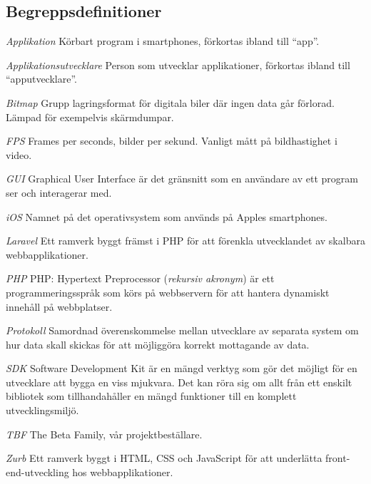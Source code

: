 \subsection{Begreppsdefinitioner}

\emph{Applikation} Körbart program i smartphones, förkortas ibland till ``app''.

\emph{Applikationsutvecklare} Person som utvecklar applikationer, förkortas  ibland till ``apputvecklare''.

\emph{Bitmap} Grupp lagringsformat för digitala biler där ingen data går förlorad. Lämpad för exempelvis skärmdumpar.

\emph{FPS} Frames per seconds, bilder per sekund. Vanligt mått på bildhastighet i video.

\emph{GUI} Graphical User Interface är det gränsnitt som en användare av ett program ser och interagerar med.

\emph{iOS} Namnet på det operativsystem som används på Apples smartphones.

\emph{Laravel} Ett ramverk byggt främst i PHP för att förenkla utvecklandet av skalbara webbapplikationer\parencite{laravel}.

\emph{PHP} PHP: Hypertext Preprocessor (\textit{rekursiv akronym}) är ett programmeringsspråk som körs på webbservern för att hantera dynamiskt innehåll på webbplatser.

\emph{Protokoll} Samordnad överenskommelse mellan utvecklare av separata system om hur data skall skickas för att möjliggöra korrekt mottagande av data.

\emph{SDK} Software Development Kit är en mängd verktyg som gör det möjligt för en utvecklare att bygga en viss mjukvara. Det kan röra sig om allt från ett enskilt bibliotek som tillhandahåller en mängd funktioner till en komplett utvecklingsmiljö.

\emph{TBF} The Beta Family, vår projektbeställare.

\emph{Zurb} Ett ramverk byggt i HTML, CSS och JavaScript för att underlätta front-end-utveckling hos webbapplikationer\parencite{zurb}.
